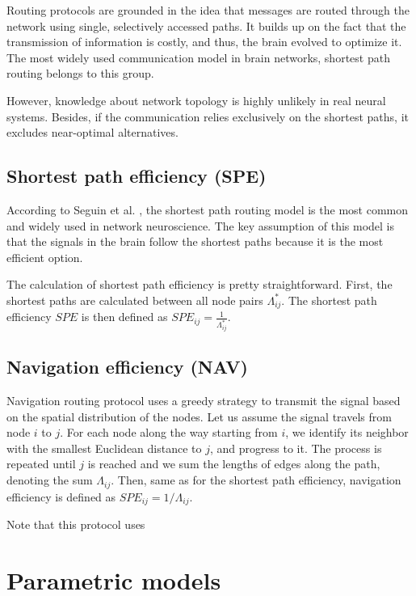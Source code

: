 Routing protocols are grounded in the idea that messages are routed through the network using single, selectively accessed paths. It builds up on the fact that the transmission of information is costly, and thus, the brain evolved to optimize it. The most widely used communication model in brain networks, shortest path routing belongs to this group. \cite{seguin_brain_2023}

However, knowledge about network topology is highly unlikely in real neural systems. Besides, if the communication relies exclusively on the shortest paths, it excludes near-optimal alternatives. \cite{avena-koenigsberger_communication_2018}

\subsection{Shortest path efficiency (SPE)}

According to Seguin et al. \cite{seguin_brain_2023}, the shortest path routing model is the most common and widely used in network neuroscience. The key assumption of this model is that the signals in the brain follow the shortest paths because it is the most efficient option.

The calculation of shortest path efficiency is pretty straightforward. First, the shortest paths are calculated between all node pairs $\Lambda^*_{ij}$. The shortest path efficiency $SPE$ is then defined as $SPE_{ij}=\frac{1}{\Lambda^*_{ij}}$.

\subsection{Navigation efficiency (NAV)}

Navigation routing protocol uses a greedy strategy to transmit the signal  based on the spatial distribution of the nodes. Let us assume the signal travels from node $i$ to $j$. For each node along the way starting from $i$, we identify its neighbor with the smallest Euclidean distance to $j$, and progress to it. The process is repeated until $j$ is reached and we sum the lengths of edges along the path, denoting the sum $\Lambda_{ij}$. Then, same as for the shortest path efficiency, navigation efficiency is defined as $SPE_{ij}=1/\Lambda_{ij}$.

Note that this protocol uses 

\section{Parametric models}

